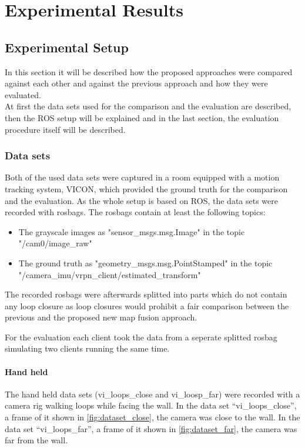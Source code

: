 \chapter{Experimental Results}

\section{Experimental Setup}
In this section it will be described how the proposed approaches were compared against each other and against the previous approach and how they were evaluated.\\
At first the data sets used for the comparison and the evaluation are described, then the \acf{ROS} setup will be explained and in the last section, the evaluation procedure itself will be described.

\subsection{Data sets}
Both of the used data sets were captured in a room equipped with a motion tracking system, VICON, which provided the ground truth for the comparison and the evaluation. As the whole setup is based on \ac{ROS}, the data sets were recorded with rosbags. The rosbags contain at least the following topics:
\begin{itemize}
  \item The grayscale images as "sensor\_msgs.msg.Image" in the topic "/cam0/image\_raw"
  \item The ground truth as "geometry\_msgs.msg.PointStamped" in the topic "/camera\_imu/vrpn\_client/estimated\_transform"
\end{itemize}

The recorded rosbags were afterwards splitted into parts which do not contain any loop closure as loop closures would prohibit a fair comparison between the previous and the proposed new map fusion approach.

For the evaluation each client took the data from a seperate splitted rosbag simulating two clients running the same time.

\subsubsection{Hand held}
The hand held data sets (vi\_loops\_close and vi\_loosp\_far) were recorded with a camera rig walking loops while facing the wall. In the data set ``vi\_loops\_close'', a frame of it shown in \autoref{fig:dataset_close}, the camera was close to the wall. In the data set ``vi\_loops\_far'', a frame of it shown in \autoref{fig:dataset_far}, the camera was far from the wall.

